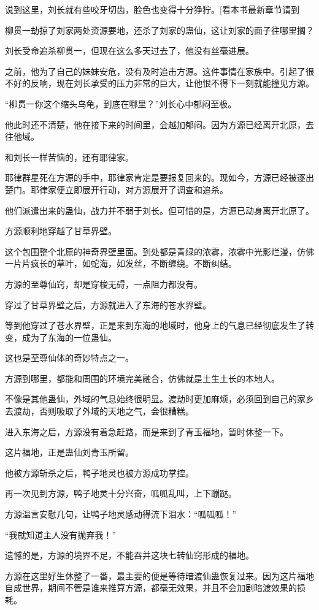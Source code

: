\begin{this_body}
说到这里，刘长就有些咬牙切齿，脸色也变得十分狰狞。[看本书最新章节请到

柳贯一劫掠了刘家两处资源要地，还杀了刘家的蛊仙，这让刘家的面子往哪里搁？

刘长受命追杀柳贯一，但现在这么多天过去了，他没有丝毫进展。

之前，他为了自己的妹妹安危，没有及时追击方源。这件事情在家族中。引起了很不好的反响，现在刘长承受的压力非常的巨大，让他恨不得下一刻就能撞见方源。

“柳贯一你这个缩头乌龟，到底在哪里？”刘长心中郁闷至极。

他此时还不清楚，他在接下来的时间里，会越加郁闷。因为方源已经离开北原，去往他域。

和刘长一样苦恼的，还有耶律家。

耶律群星死在方源的手中，耶律家肯定是要报复回来的。现如今，方源已经被逐出楚门。耶律家便立即展开行动，对方源展开了调查和追杀。

他们派遣出来的蛊仙，战力并不弱于刘长。但可惜的是，方源已动身离开北原了。

方源顺利地穿越了甘草界壁。

这个包围整个北原的神奇界壁里面。到处都是青绿的浓雾，浓雾中光影烂漫，仿佛一片片疯长的草叶，如蛇海，如发丝，不断缠绕。不断纠结。

方源的至尊仙窍，却是穿梭无碍，一点阻力都没有。

穿过了甘草界壁之后，方源就进入了东海的苍水界壁。

等到他穿过了苍水界壁，正是来到东海的地域时，他身上的气息已经彻底发生了转变，成为了东海的一位蛊仙。

这也是至尊仙体的奇妙特点之一。

方源到哪里，都能和周围的环境完美融合，仿佛就是土生土长的本地人。

不像是其他蛊仙，外域的气息始终很明显。渡劫时更加麻烦，必须回到自己的家乡去渡劫，否则吸取了外域的天地之气，会很糟糕。

进入东海之后，方源没有着急赶路，而是来到了青玉福地，暂时休整一下。

这片福地，正是蛊仙刘青玉所留。

他被方源斩杀之后，鸭子地灵也被方源成功掌控。

再一次见到方源，鸭子地灵十分兴奋，呱呱乱叫，上下蹦跶。

方源温言安慰几句，让鸭子地灵感动得流下泪水：“呱呱呱！”

“我就知道主人没有抛弃我！”

遗憾的是，方源的境界不足，不能吞并这块七转仙窍形成的福地。

方源在这里好生休整了一番，最主要的便是等待暗渡仙蛊恢复过来。因为这片福地自成世界，期间不管是谁来推算方源，都毫无效果，并且不会加剧暗渡效果的损耗。


\end{this_body}
